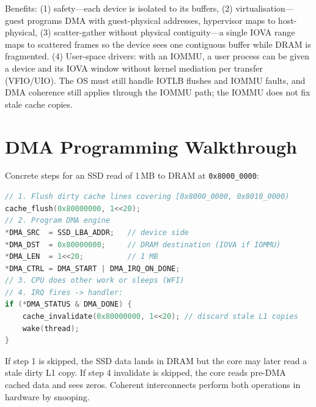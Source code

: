 \begin{center}
\end{center}

Benefits: (1) safety---each device is isolated to its buffers, (2) virtualisation---guest programs DMA with guest-physical addresses, hypervisor maps to host-physical, (3) scatter-gather without physical contiguity---a single IOVA range maps to scattered frames so the device sees one contiguous buffer while DRAM is fragmented. (4) User-space drivers: with an IOMMU, a user process can be given a device and its IOVA window without kernel mediation per transfer (VFIO/UIO). The OS must still handle IOTLB flushes and IOMMU faults, and DMA coherence still applies through the IOMMU path; the IOMMU does not fix stale cache copies.

\section{DMA Programming Walkthrough}
Concrete steps for an SSD read of 1\,MB to DRAM at \texttt{0x8000\_0000}:

\begin{lstlisting}[language=C]
// 1. Flush dirty cache lines covering [0x8000_0000, 0x8010_0000)
cache_flush(0x80000000, 1<<20);
// 2. Program DMA engine
*DMA_SRC  = SSD_LBA_ADDR;   // device side
*DMA_DST  = 0x80000000;     // DRAM destination (IOVA if IOMMU)
*DMA_LEN  = 1<<20;          // 1 MB
*DMA_CTRL = DMA_START | DMA_IRQ_ON_DONE;
// 3. CPU does other work or sleeps (WFI)
// 4. IRQ fires -> handler:
if (*DMA_STATUS & DMA_DONE) {
    cache_invalidate(0x80000000, 1<<20); // discard stale L1 copies
    wake(thread);
}
\end{lstlisting}
If step 1 is skipped, the SSD data lands in DRAM but the core may later
read a stale dirty L1 copy. If step 4 invalidate is skipped, the core reads
pre-DMA cached data and sees zeros. Coherent interconnects perform both
operations in hardware by snooping.

